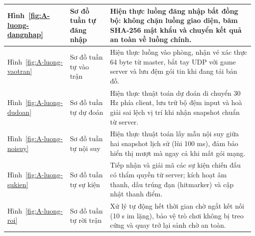 \begin{center}
\begin{tabularx}{\linewidth}{|L{2.2cm}|L{4.2cm}|Y|}
Hình~\ref{fig:A-luong-dangnhap} & Sơ đồ tuần tự đăng nhập & Hiện thực luồng đăng nhập bất đồng bộ: không chặn luồng giao diện, băm SHA-256 mật khẩu và chuyển kết quả an toàn về luồng chính. \\ \hline
Hình~\ref{fig:A-luong-vaotran} & Sơ đồ tuần tự vào trận & Hiện thực luồng vào phòng, nhận vé xác thực 64 byte từ master, bắt tay UDP với game server và lưu đệm gói tin khi đang tải bản đồ. \\ \hline
Hình~\ref{fig:A-luong-dudoan} & Sơ đồ tuần tự dự đoán & Hiện thực thuật toán dự đoán di chuyển 30 Hz phía client, lưu trữ bộ đệm input và hoà giải sai lệch vị trí khi nhận snapshot chuẩn từ server. \\ \hline
Hình~\ref{fig:A-luong-noisuy} & Sơ đồ tuần tự nội suy & Hiện thực thuật toán lấy mẫu nội suy giữa hai snapshot lịch sử (lùi 100 ms), đảm bảo hiển thị mượt mà ngay cả khi mất gói mạng. \\ \hline
Hình~\ref{fig:A-luong-sukien} & Sơ đồ tuần tự sự kiện & Tiếp nhận và giải mã các sự kiện chiến đấu có thẩm quyền từ server; kích hoạt âm thanh, dấu trúng đạn (hitmarker) và cập nhật thanh điểm. \\ \hline
Hình~\ref{fig:A-luong-roi} & Sơ đồ tuần tự rời trận & Xử lý tự động hết thời gian chờ ngắt kết nối (10 s im lặng), bảo vệ trò chơi không bị treo cứng và quay trở lại sảnh chờ an toàn. \\ \hline
\end{tabularx}
\end{center}
